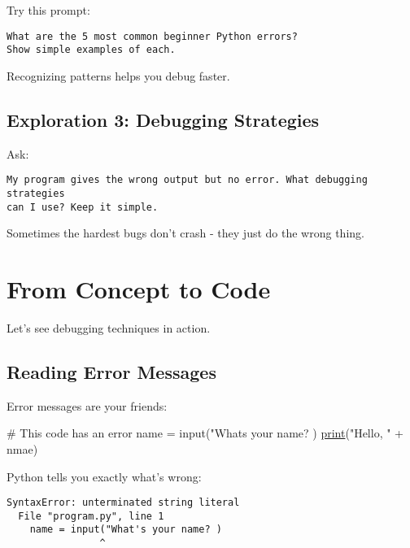\documentclass[
  letterpaper,
  DIV=11,
  numbers=noendperiod,
  oneside]{scrreprt}
\newenvironment{Shaded}{}{}
\newcommand{\BuiltInTok}[1]{\textcolor[rgb]{0.84,0.23,0.29}{#1}}
\newcommand{\CommentTok}[1]{\textcolor[rgb]{0.42,0.45,0.49}{#1}}
\newcommand{\ErrorTok}[1]{\textcolor[rgb]{1.00,0.33,0.33}{\underline{#1}}}
\newcommand{\NormalTok}[1]{\textcolor[rgb]{0.14,0.16,0.18}{#1}}
\newcommand{\OperatorTok}[1]{\textcolor[rgb]{0.14,0.16,0.18}{#1}}
\newcommand{\StringTok}[1]{\textcolor[rgb]{0.01,0.18,0.38}{#1}}
\begin{document}
Try this prompt:

\begin{verbatim}
What are the 5 most common beginner Python errors? 
Show simple examples of each.
\end{verbatim}

Recognizing patterns helps you debug faster.

\subsection{Exploration 3: Debugging
Strategies}\label{exploration-3-debugging-strategies}

Ask:

\begin{verbatim}
My program gives the wrong output but no error. What debugging strategies 
can I use? Keep it simple.
\end{verbatim}

Sometimes the hardest bugs don't crash - they just do the wrong thing.

\section{From Concept to Code}\label{from-concept-to-code-8}

Let's see debugging techniques in action.

\subsection{Reading Error Messages}\label{reading-error-messages}

Error messages are your friends:

\begin{Shaded}
\begin{Highlighting}[]
\CommentTok{\# This code has an error}
\NormalTok{name }\OperatorTok{=} \BuiltInTok{input}\NormalTok{(}\StringTok{"What\textquotesingle{}s your name? )}
\ErrorTok{print}\NormalTok{(}\StringTok{"Hello, "} \OperatorTok{+}\NormalTok{ nmae)}
\end{Highlighting}
\end{Shaded}

Python tells you exactly what's wrong:

\begin{verbatim}
SyntaxError: unterminated string literal
  File "program.py", line 1
    name = input("What's your name? )
                ^
\end{verbatim}
\end{document}
